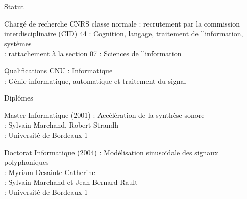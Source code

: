 \begin{frame}{Statut}
\begin{block}{Chargé de recherche CNRS classe normale}
 : recrutement par la commission interdisciplinaire (CID) 44 : \og Cognition, langage, traitement de l’information, systèmes \fg \\
 : rattachement à la section 07 : \og Sciences de l'information \fg
\end{block}
\begin{block}{Qualifications CNU}
 : \og Informatique \fg \\
 : \og Génie informatique, automatique et traitement du signal \fg
\end{block}
\end{frame}

\begin{frame}{Diplômes}
\begin{block}{Master Informatique (2001)}
 : \og Accélération de la synthèse sonore \fg \\
 : Sylvain Marchand, Robert Strandh \\
 : Université de Bordeaux 1
\end{block}
\begin{block}{Doctorat Informatique (2004)}
: \og Modélisation sinusoïdale des signaux polyphoniques \fg \\
: Myriam Desainte-Catherine \\
: Sylvain Marchand et Jean-Bernard Rault \\
: Université de Bordeaux 1
\end{block}
\end{frame}



